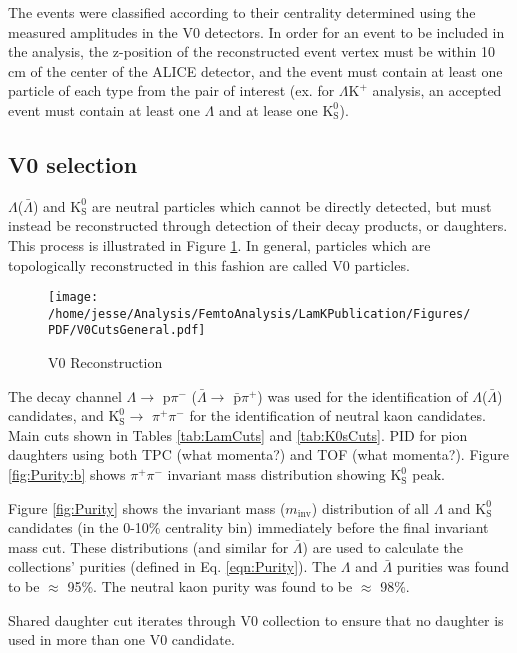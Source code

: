 \documentclass[ALICE,manyauthors]{cernphprep}
\newcommand{\Lam}{$\Lambda$\xspace}
\newcommand{\ALam}{$\bar{\Lambda}$\xspace}
\newcommand{\LamALam}{$\Lambda$($\bar{\Lambda}$)\xspace}
\newcommand{\Ks}{$\mathrm{K^{0}_{S}}$\xspace}
\newcommand{\LamKchP}{$\Lambda\mathrm{K^{+}}$\xspace}
\begin{document}
The events were classified according to their centrality determined using the measured amplitudes in the V0 detectors.
In order for an event to be included in the analysis, the z-position of the reconstructed event vertex must be within 10 cm of the center of the ALICE detector, and the event must contain at least one particle of each type from the pair of interest (ex. for \LamKchP analysis, an accepted event must contain at least one \Lam and at lease one \Ks).




\subsection{V0 selection}
\label{sec:V0Selection}

\LamALam and \Ks are neutral particles which cannot be directly detected, but must instead be reconstructed through detection of their decay products, or daughters.  
This process is illustrated in Figure \ref{fig:V0Reconstruction}.
In general, particles which are topologically reconstructed in this fashion are called V0 particles.

\begin{figure}[h]
  \centering
  \texttt{[image: /home/jesse/Analysis/FemtoAnalysis/LamKPublication/Figures/PDF/V0CutsGeneral.pdf]}
  \caption[V0 Reconstruction]{V0 Reconstruction}
  \label{fig:V0Reconstruction}
\end{figure}

The decay channel \Lam $\rightarrow$ p$\pi^{-}$ (\ALam $\rightarrow$ $\bar{\mathrm{p}}\pi^{+}$) was used for the identification of \LamALam candidates, and \Ks $\rightarrow$ $\pi^{+}\pi^{-}$ for the identification of neutral kaon candidates.
Main cuts shown in Tables \ref{tab:LamCuts} and \ref{tab:K0sCuts}.
PID for pion daughters using both TPC (what momenta?) and TOF (what momenta?).
Figure \ref{fig:Purity:b} shows $\pi^{+}\pi^{-}$ invariant mass distribution showing \Ks peak.

Figure \ref{fig:Purity} shows the invariant mass ($m_{\mathrm{inv}}$) distribution of all \Lam and \Ks candidates (in the 0-10\% centrality bin) immediately before the final invariant mass cut.
These distributions (and similar for \ALam) are used to calculate the collections' purities (defined in Eq. \ref{eqn:Purity}).
The \Lam and \ALam purities was found to be $\approx$ 95\%.
The neutral kaon purity was found to be $\approx$ 98\%.



Shared daughter cut iterates through V0 collection to ensure that no daughter is used in more than one V0 candidate.
\end{document}
